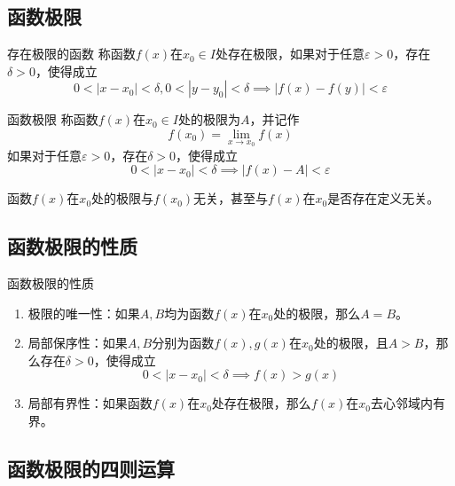 \documentclass[lang = cn, scheme = chinese, thmcnt = section]{elegantbook}
\begin{document}
\subsection{函数极限}

\begin{definition}{存在极限的函数}
	称函数$f(x)$在$x_0\in I$处存在极限，如果对于任意$\varepsilon>0$，存在$\delta>0$，使得成立
	$$
	0<|x-x_0|<\delta,0<|y-y_0|<\delta\implies
	|f(x)-f(y)|<\varepsilon
	$$
\end{definition}

\begin{definition}{函数极限}
	称函数$f(x)$在$x_0\in I$处的极限为$A$，并记作
	$$
	f(x_0)=\lim_{x\to x_0}f(x)
	$$
	如果对于任意$\varepsilon>0$，存在$\delta>0$，使得成立
	$$
	0<|x-x_0|<\delta\implies
	|f(x)-A|<\varepsilon
	$$
\end{definition}

\begin{note}
	函数$f(x)$在$x_0$处的极限与$f(x_0)$无关，甚至与$f(x)$在$x_0$是否存在定义无关。
\end{note}

\subsection{函数极限的性质}

\begin{proposition}{函数极限的性质}
	\begin{enumerate}
		\item 极限的唯一性：如果$A,B$均为函数$f(x)$在$x_0$处的极限，那么$A=B$。
		\item 局部保序性：如果$A,B$分别为函数$f(x),g(x)$在$x_0$处的极限，且$A>B$，那么存在$\delta>0$，使得成立
		$$
		0<|x-x_0|<\delta\implies
		f(x)>g(x)
		$$
		\item 局部有界性：如果函数$f(x)$在$x_0$处存在极限，那么$f(x)$在$x_0$去心邻域内有界。
	\end{enumerate}
\end{proposition}

\subsection{函数极限的四则运算}
\end{document}
